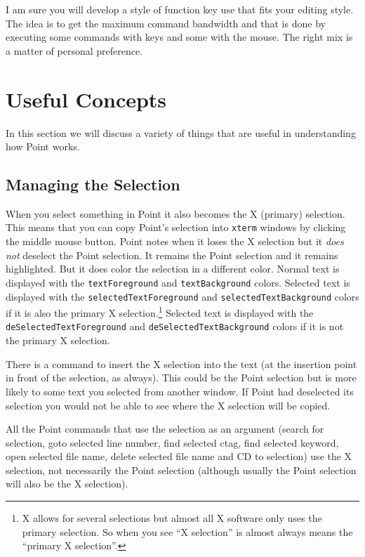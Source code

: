 I am sure you will develop a style of function key use that
fits your editing style.
The idea is to get the maximum command bandwidth and that is done by
executing some commands with keys and some with the mouse.
The right mix is a matter of personal preference.






\section{Useful Concepts} \label{sect:concepts}

In this section we will discuss a variety of things that are
useful in understanding how Point works.


\subsection{ Managing the Selection }

When you select something in Point it also becomes the X (primary)
selection.
This means that you can copy Point's selection into {\tt xterm} windows
by clicking the middle mouse button.
Point notes when it loses the X selection but it {\it does not}
deselect the Point selection.
It remains the Point selection and it remains highlighted.
But it does color the selection in a different color.
Normal text is displayed with the {\tt textForeground} and
{\tt textBackground} colors.
Selected text is displayed with the {\tt selectedTextForeground} and
{\tt selectedTextBackground} colors
if it is also the primary X selection.\footnote{
	X allows for several selections but almost all X software only
	uses the primary selection.  So when you see ``X selection''
	is almost always means the ``primary X selection''.}
Selected text is displayed with the {\tt deSelectedTextForeground} and
{\tt deSelectedTextBackground} colors if it is not the primary X selection.

There is a command to insert the X selection into the
text (at the insertion point in front of the selection, as always).
This could be the Point selection but is more likely to some text
you selected from another window.
If Point had deselected its selection you would not be able to see
where the X selection will be copied.

All the Point commands that use the selection as an argument
(search for selection, goto selected line number,
find selected ctag, find selected keyword, open selected file name,
delete selected file name and CD to selection)
use the X selection, not necessarily the Point selection
(although usually the Point selection will also be
the X selection).

